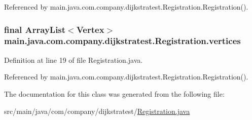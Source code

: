Referenced by main.\-java.\-com.\-company.\-dijkstratest.\-Registration.\-Registration().

\hypertarget{classmain_1_1java_1_1com_1_1company_1_1dijkstratest_1_1_registration_aacd4ad524e3c3d2d3e163ba14dc5e5d4}{
\subsubsection[{vertices}]{\setlength{\rightskip}{0pt plus 5cm}final Array\-List$<${\bf Vertex}$>$ main.\-java.\-com.\-company.\-dijkstratest.\-Registration.\-vertices\hspace{0.3cm}{\ttfamily [private]}}}\label{classmain_1_1java_1_1com_1_1company_1_1dijkstratest_1_1_registration_aacd4ad524e3c3d2d3e163ba14dc5e5d4}


Definition at line 19 of file Registration.\-java.



Referenced by main.\-java.\-com.\-company.\-dijkstratest.\-Registration.\-Registration().



The documentation for this class was generated from the following file\-:\begin{DoxyCompactItemize}
\item 
src/main/java/com/company/dijkstratest/\hyperlink{_registration_8java}{Registration.\-java}\end{DoxyCompactItemize}
